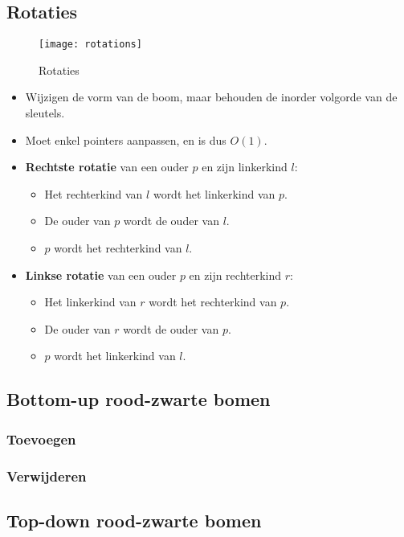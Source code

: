 \subsection{Rotaties}
\begin{figure}[ht]
    \centering
    \texttt{[image: rotations]}
    \caption{Rotaties}
    \label{fig:rotations}
\end{figure}
\begin{itemize}
    \item Wijzigen de vorm van de boom, maar behouden de inorder volgorde van de sleutels.
    \item Moet enkel pointers aanpassen, en is dus $O(1)$.
    \item \textbf{Rechtste rotatie} van een ouder $p$ en zijn linkerkind $l$:
    \begin{itemize}
        \item Het rechterkind van $l$ wordt het linkerkind van $p$.
        \item De ouder van $p$ wordt de ouder van $l$.
        \item $p$ wordt het rechterkind van $l$. 
    \end{itemize}
    \item \textbf{Linkse rotatie} van een ouder $p$ en zijn rechterkind $r$:
    \begin{itemize}
        \item Het linkerkind van $r$ wordt het rechterkind van $p$.
        \item De ouder van $r$ wordt de ouder van $p$.
        \item $p$ wordt het linkerkind van $l$. 
    \end{itemize}
\end{itemize}

\subsection{Bottom-up rood-zwarte bomen}
\subsubsection{Toevoegen}



\subsubsection{Verwijderen}

\subsection{Top-down rood-zwarte bomen}
